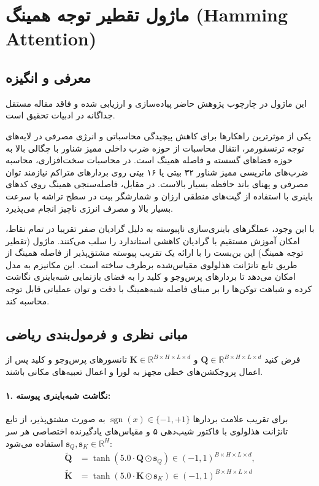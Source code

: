 \section{ماژول تقطیر توجه همینگ (Hamming Attention)}
\label{sec:module_hamming_attention}

\subsection{معرفی و انگیزه}
این ماژول در چارچوب پژوهش حاضر پیاده‌سازی و ارزیابی شده و فاقد مقاله مستقل جداگانه در ادبیات تحقیق است.

یکی از موثرترین راهکارها برای کاهش پیچیدگی محاسباتی و انرژی مصرفی در لایه‌های توجه ترنسفورمر، انتقال محاسبات از حوزه ضرب داخلی ممیز شناور با چگالی بالا به حوزه فضاهای گسسته و فاصله همینگ  است. در محاسبات سخت‌افزاری، محاسبه ضرب‌های ماتریسی ممیز شناور ۳۲ بیتی یا ۱۶ بیتی روی بردارهای متراکم نیازمند توان مصرفی و پهنای باند حافظه بسیار بالاست. در مقابل، فاصله‌سنجی همینگ روی کدهای باینری با استفاده از گیت‌های منطقی ارزان  و شمارشگر بیت  در سطح تراشه با سرعت بسیار بالا و مصرف انرژی ناچیز انجام می‌پذیرد.

با این وجود، عملگرهای باینری‌سازی ناپیوسته به دلیل گرادیان صفر تقریبا در تمام نقاط، امکان آموزش مستقیم با گرادیان کاهشی استاندارد را سلب می‌کنند. ماژول  (تقطیر توجه همینگ) این بن‌بست را با ارائه یک تقریب پیوسته مشتق‌پذیر از فاصله همینگ از طریق تابع تانژانت هذلولوی مقیاس‌شده  برطرف ساخته است. این مکانیزم به مدل امکان می‌دهد تا بردارهای پرس‌وجو و کلید را به فضای بازنمایی شبه‌باینری نگاشت کرده و شباهت توکن‌ها را بر مبنای فاصله شبه‌همینگ با دقت و توان عملیاتی قابل توجه محاسبه کند.

\subsection{مبانی نظری و فرمول‌بندی ریاضی}
فرض کنید $\mathbf{Q} \in \mathbb{R}^{B \times H \times L \times d}$ و $\mathbf{K} \in \mathbb{R}^{B \times H \times L \times d}$ تانسورهای پرس‌وجو و کلید پس از اعمال پروجکشن‌های خطی مجهز به لورا و اعمال تعبیه‌های مکانی  باشند.

\paragraph{۱. نگاشت شبه‌باینری پیوسته:}
برای تقریب علامت بردارها $\operatorname{sgn}(x) \in \{-1, +1\}$ به صورت مشتق‌پذیر، از تابع تانژانت هذلولوی با فاکتور شیب‌دهی ۵ و مقیاس‌های یادگیرنده اختصاصی هر سر $\mathbf{s}_Q, \mathbf{s}_K \in \mathbb{R}^H$ استفاده می‌شود:
\begin{align}
\tilde{\mathbf{Q}} &= \tanh\left(5.0 \cdot \mathbf{Q} \odot \mathbf{s}_Q\right) \in (-1, 1)^{B \times H \times L \times d}, \\
\tilde{\mathbf{K}} &= \tanh\left(5.0 \cdot \mathbf{K} \odot \mathbf{s}_K\right) \in (-1, 1)^{B \times H \times L \times d}
\end{align}

